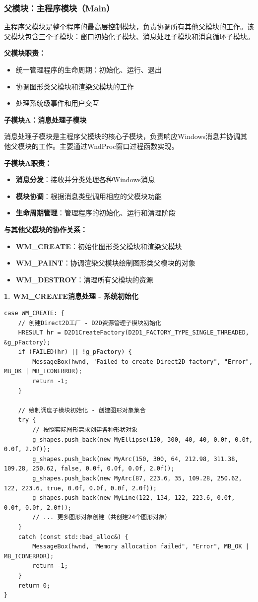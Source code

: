 \documentclass[12pt,a4paper]{article}
\begin{document}
\subsubsection{父模块：主程序模块（Main）}

主程序父模块是整个程序的最高层控制模块，负责协调所有其他父模块的工作。该父模块包含三个子模块：窗口初始化子模块、消息处理子模块和消息循环子模块。

\textbf{父模块职责：}
\begin{itemize}
    \item 统一管理程序的生命周期：初始化、运行、退出
    \item 协调图形类父模块和渲染父模块的工作
    \item 处理系统级事件和用户交互
\end{itemize}

\textbf{子模块A：消息处理子模块}

消息处理子模块是主程序父模块的核心子模块，负责响应Windows消息并协调其他父模块的工作。主要通过WndProc窗口过程函数实现。

\textbf{子模块A职责：}
\begin{itemize}
    \item \textbf{消息分发}：接收并分类处理各种Windows消息
    \item \textbf{模块协调}：根据消息类型调用相应的父模块功能
    \item \textbf{生命周期管理}：管理程序的初始化、运行和清理阶段
\end{itemize}

\textbf{与其他父模块的协作关系：}
\begin{itemize}
    \item \textbf{WM\_CREATE}：初始化图形类父模块和渲染父模块
    \item \textbf{WM\_PAINT}：协调渲染父模块绘制图形类父模块的对象
    \item \textbf{WM\_DESTROY}：清理所有父模块的资源
\end{itemize}

\textbf{1. WM\_CREATE消息处理 - 系统初始化}

\begin{lstlisting}[caption=系统初始化消息处理]
case WM_CREATE: {
    // 创建Direct2D工厂 - D2D资源管理子模块初始化
    HRESULT hr = D2D1CreateFactory(D2D1_FACTORY_TYPE_SINGLE_THREADED, &g_pFactory);
    if (FAILED(hr) || !g_pFactory) {
        MessageBox(hwnd, "Failed to create Direct2D factory", "Error", MB_OK | MB_ICONERROR);
        return -1;
    }

    // 绘制调度子模块初始化 - 创建图形对象集合
    try {
        // 按照实际图形需求创建各种形状对象
        g_shapes.push_back(new MyEllipse(150, 300, 40, 40, 0.0f, 0.0f, 0.0f, 2.0f));
        g_shapes.push_back(new MyArc(150, 300, 64, 212.98, 311.38, 109.28, 250.62, false, 0.0f, 0.0f, 0.0f, 2.0f));
        g_shapes.push_back(new MyArc(87, 223.6, 35, 109.28, 250.62, 122, 223.6, true, 0.0f, 0.0f, 0.0f, 2.0f));
        g_shapes.push_back(new MyLine(122, 134, 122, 223.6, 0.0f, 0.0f, 0.0f, 2.0f));
        // ... 更多图形对象创建（共创建24个图形对象）
    }
    catch (const std::bad_alloc&) {
        MessageBox(hwnd, "Memory allocation failed", "Error", MB_OK | MB_ICONERROR);
        return -1;
    }
    return 0;
}
\end{lstlisting}
\end{document}
